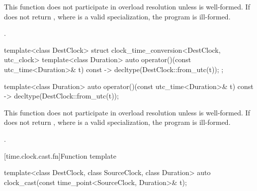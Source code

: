 \begin{itemdescr}
\pnum
\remarks
This function does not participate in overload resolution unless
 is well-formed.
If  does not return
,
where  is a valid  specialization,
the program is ill-formed.

\pnum
\returns {}.
\end{itemdescr}

\begin{codeblock}
template<class DestClock>
struct clock_time_conversion<DestClock, utc_clock> {
  template<class Duration>
    auto operator()(const utc_time<Duration>& t) const
      -> decltype(DestClock::from_utc(t));
};
\end{codeblock}

%
\begin{itemdecl}
template<class Duration>
  auto operator()(const utc_time<Duration>& t) const
    -> decltype(DestClock::from_utc(t));
\end{itemdecl}

\begin{itemdescr}
\pnum
\remarks
This function does not participate in overload resolution unless
 is well-formed.
If  does not return
,
where  is a valid  specialization,
the program is ill-formed.

\pnum
\returns {}.
\end{itemdescr}

[time.clock.cast.fn]{Function template }

%
\begin{itemdecl}
template<class DestClock, class SourceClock, class Duration>
  auto clock_cast(const time_point<SourceClock, Duration>& t);
\end{itemdecl}

